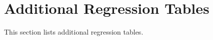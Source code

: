 \documentclass[\econtexRoot/ProjectABM]{subfiles}
\begin{document}

\section{Additional Regression Tables}\label{sec:ApndxRegTables}
This section lists additional regression tables.


%
%



%

%
%

%

%

%

%
\end{document}
